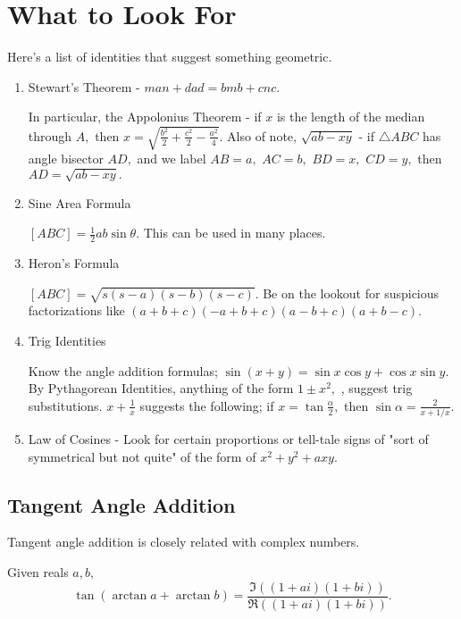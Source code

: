 \documentclass[blue,onecol]{shooting}
\begin{document}
\section{What to Look For}
Here's a list of identities that suggest something geometric.
\begin{enumerate}
    \item Stewart's Theorem - $man+dad=bmb+cnc.$
    \begin{itemize}
    \Item In particular, the Appolonius Theorem - if $x$ is the length of the median through $A,$ then $x=\sqrt{\frac{b^2}{2}+\frac{c^2}{2}-\frac{a^2}{4}}.$
    \Item Also of note, $\sqrt{ab-xy}$ - if $\triangle ABC$ has angle bisector $AD,$ and we label $AB=a,$ $AC=b,$ $BD=x,$ $CD=y,$ then $AD=\sqrt{ab-xy}.$
    \end{itemize}
    \item Sine Area Formula
	\begin{itemize}
	\Item $[ABC]=\frac{1}{2}ab\sin \theta.$ This can be used in many places.
	\end{itemize}
    \item Heron's Formula
    \begin{itemize}
    \Item $[ABC]=\sqrt{s(s-a)(s-b)(s-c)}.$ Be on the lookout for suspicious factorizations like $(a+b+c)(-a+b+c)(a-b+c)(a+b-c).$
    \end{itemize}
    \item Trig Identities
    \begin{itemize}
	\Item Know the angle addition formulas; $\sin(x+y)=\sin x\cos y+\cos x\sin y.$
	\Item By Pythagorean Identities, anything of the form $1\pm x^2,$ , suggest trig substitutions.
    \Item $x+\frac{1}{x}$ suggests the following; if $x=\tan\frac{\alpha}{2},$ then $\sin \alpha = \frac{2}{x+1/x}.$
    \end{itemize}
    \item Law of Cosines - Look for certain proportions or tell-tale signs of "sort of symmetrical but not quite" of the form of $x^2+y^2+axy.$ 
\end{enumerate}

\subsection{Tangent Angle Addition}

Tangent angle addition is closely related with complex numbers.

\begin{theo}
Given reals $a,b,$
\[\tan(\arctan a + \arctan b)=\frac{\Im\left((1+ai)(1+bi)\right)}{\Re\left((1+ai)(1+bi)\right)}.\]
\end{theo}
\end{document}

